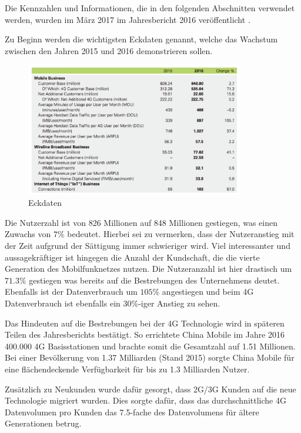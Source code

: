 Die Kennzahlen und Informationen, die in den folgenden Abschnitten verwendet werden, wurden im März 2017 im Jahresbericht 2016 veröffentlicht \cite{chinareport}. 

Zu Beginn werden die wichtigsten Eckdaten genannt, welche das Wachstum zwischen den Jahren 2015 und 2016 demonstrieren sollen. 

\begin{figure}[H]
\centering
\includegraphics[width=0.85\textwidth]{pictures/china_users}
\caption{Eckdaten}
\label{fig:lteplus}
\end{figure}

Die Nutzerzahl ist von 826 Millionen auf 848 Millionen gestiegen, was einen Zuwachs von $7\%$ bedeutet. Hierbei sei zu vermerken, dass der Nutzeranstieg mit der Zeit aufgrund der Sättigung immer schwieriger wird. Viel interessanter und aussagekräftiger ist hingegen die Anzahl der Kundschaft, die die vierte Generation des Mobilfunknetzes nutzen. Die Nutzeranzahl ist hier drastisch um $71.3\%$ gestiegen was bereits auf die Bestrebungen des Unternehmens deutet. Ebenfalls ist der Datenverbrauch um $105\%$ angestiegen und beim 4G Datenverbrauch ist ebenfalls ein $30\%$-iger Anstieg zu sehen.

Das Hindeuten auf die Bestrebungen bei der 4G Technologie wird in späteren Teilen des Jahresberichts bestätigt. So errichtete China Mobile im Jahre 2016 400.000 4G Basisstationen und brachte somit die Gesamtzahl auf 1.51 Millionen. Bei einer Bevölkerung von 1.37 Milliarden (Stand 2015) sorgte China Mobile für eine flächendeckende Verfügbarkeit für bis zu 1.3 Milliarden Nutzer. 

Zusätzlich zu Neukunden wurde dafür gesorgt, dass 2G/3G Kunden auf die neue Technologie migriert wurden. Dies sorgte dafür, dass das durchschnittliche 4G Datenvolumen pro Kunden das 7.5-fache des Datenvolumens für ältere Generationen betrug.


